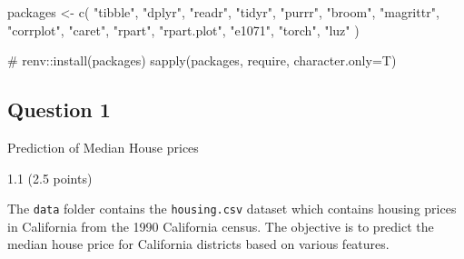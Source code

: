 \documentclass[
  letterpaper,
  DIV=11,
  numbers=noendperiod]{scrartcl}
\newenvironment{Shaded}{\begin{snugshade}}{\end{snugshade}}
\newcommand{\AttributeTok}[1]{\textcolor[rgb]{0.40,0.45,0.13}{#1}}
\newcommand{\CommentTok}[1]{\textcolor[rgb]{0.37,0.37,0.37}{#1}}
\newcommand{\FunctionTok}[1]{\textcolor[rgb]{0.28,0.35,0.67}{#1}}
\newcommand{\NormalTok}[1]{\textcolor[rgb]{0.00,0.23,0.31}{#1}}
\newcommand{\OtherTok}[1]{\textcolor[rgb]{0.00,0.23,0.31}{#1}}
\newcommand{\StringTok}[1]{\textcolor[rgb]{0.13,0.47,0.30}{#1}}
\begin{document}
\begin{Shaded}
\begin{Highlighting}[]
\NormalTok{packages }\OtherTok{\textless{}{-}} \FunctionTok{c}\NormalTok{(}
  \StringTok{"tibble"}\NormalTok{,}
  \StringTok{"dplyr"}\NormalTok{, }
  \StringTok{"readr"}\NormalTok{, }
  \StringTok{"tidyr"}\NormalTok{, }
  \StringTok{"purrr"}\NormalTok{, }
  \StringTok{"broom"}\NormalTok{,}
  \StringTok{"magrittr"}\NormalTok{,}
  \StringTok{"corrplot"}\NormalTok{,}
  \StringTok{"caret"}\NormalTok{,}
  \StringTok{"rpart"}\NormalTok{,}
  \StringTok{"rpart.plot"}\NormalTok{,}
  \StringTok{"e1071"}\NormalTok{,}
  \StringTok{"torch"}\NormalTok{, }
  \StringTok{"luz"}
\NormalTok{)}

\CommentTok{\# renv::install(packages)}
\FunctionTok{sapply}\NormalTok{(packages, require, }\AttributeTok{character.only=}\NormalTok{T)}
\end{Highlighting}
\end{Shaded}

\hypertarget{section}{%
\subsection{\texorpdfstring{}{    }}\label{section}}

\hypertarget{question-1}{%
\subsection{Question 1}\label{question-1}}

\begin{tcolorbox}[enhanced jigsaw, bottomtitle=1mm, rightrule=.15mm, left=2mm, colback=white, opacityback=0, bottomrule=.15mm, titlerule=0mm, toprule=.15mm, colframe=quarto-callout-tip-color-frame, arc=.35mm, colbacktitle=quarto-callout-tip-color!10!white, breakable, leftrule=.75mm, coltitle=black, title=\textcolor{quarto-callout-tip-color}{\faLightbulb}\hspace{0.5em}{60 points}, opacitybacktitle=0.6, toptitle=1mm]

Prediction of Median House prices

\end{tcolorbox}

1.1 (2.5 points)

The \texttt{data} folder contains the \texttt{housing.csv} dataset which
contains housing prices in California from the 1990 California census.
The objective is to predict the median house price for California
districts based on various features.
\end{document}
